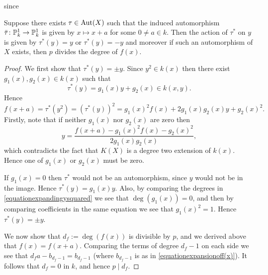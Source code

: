 since 

\begin{lem}\label{lemmatauactsbyplusminusoneony}
    Suppose there exists $\tau \in \operatorname{Aut}(X)$ such that the induced automorphism $\bar \tau \colon \mathbb P_k^1 \rightarrow \mathbb P_k^1$ is given by $x \mapsto x+ a$ for some $0 \neq a \in k$.
    Then the action of $\tau^*$ on $y$ is given by $\tau^*(y) = y$ or $\tau^*(y) = -y$ and moreover if such an automorphism of $X$ exists, then $p$ divides the degree of $f(x)$.
    \end{lem}
    \begin{proof}
    We first show that $\tau^*(y) = \pm y$.
    Since $y^2 \in k(x)$ then there exist $g_1(x), g_2(x) \in k(x)$ such that 
        \begin{equation*}
        \tau^*(y) = g_1(x)y + g_2(x) \in k(x,y).
        \end{equation*}
    Hence
        \begin{equation}\label{equationexpandingysquared}
        f(x+a) = \tau^*(y^2) = (\tau^*(y))^2 = g_1(x)^2f(x)+2g_1(x)g_2(x)y + g_2(x)^2.
        \end{equation}
    Firstly, note that if neither $g_1(x)$ nor $g_2(x)$ are zero then
        \[
        y = \frac{f(x+a) - g_1(x)^2f(x) - g_2(x)^2}{2g_1(x)g_2(x)},
        \]
    which contradicts the fact that $K(X)$ is a degree two extension of $k(x)$.
    Hence one of $g_1(x)$ or $g_2(x)$ must be zero.
    
    If $g_1(x) = 0$ then $\tau^*$ would not be an automorphism, since $y$ would not be in the image.
    Hence $\tau^*(y) = g_1(x)y$.
    Also, by comparing the degrees in \eqref{equationexpandingysquared} we see that $\deg(g_1(x)) = 0$, and then by comparing coefficients in the same equation we see that $g_1(x)^2 = 1$.
    Hence $\tau^*(y) = \pm y$.

    We now show that $d_f := \deg(f(x))$ is divisible by $p$, and we derived above that $f(x) = f(x+a)$.
    Comparing the terms of degree $d_f-1$ on each side we see that $d_fa - b_{d_f -1} = b_{d_f-1}$ (where $b_{d_f - 1}$ is as in \eqref{equationexpansionoff(x)}).
    It follows that $d_f = 0$ in $k$, and hence $p \mid d_f$.
    \end{proof}


